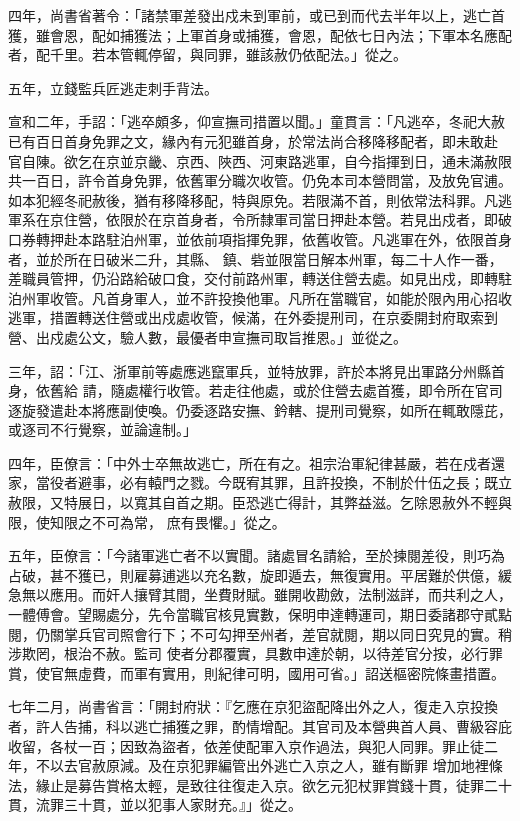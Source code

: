 \begin{pinyinscope}
 四年，尚書省著令：「諸禁軍差發出戍未到軍前，或已到而代去半年以上，逃亡首獲，雖會恩，配如捕獲法；上軍首身或捕獲，會恩，配依七日內法；下軍本名應配者，配千里。若本管輒停留，與同罪，雖該赦仍依配法。」從之。



 五年，立錢監兵匠逃走刺手背法。



 宣和二年，手詔：「逃卒頗多，仰宣撫司措置以聞。」童貫言：「凡逃卒，冬祀大赦已有百日首身免罪之文，緣內有元犯雖首身，於常法尚合移降移配者，即未敢赴
 官自陳。欲乞在京並京畿、京西、陜西、河東路逃軍，自今指揮到日，通未滿赦限共一百日，許令首身免罪，依舊軍分職次收管。仍免本司本營問當，及放免官逋。如本犯經冬祀赦後，猶有移降移配，特與原免。若限滿不首，則依常法科罪。凡逃軍系在京住營，依限於在京首身者，令所隸軍司當日押赴本營。若見出戍者，即破口券轉押赴本路駐泊州軍，並依前項指揮免罪，依舊收管。凡逃軍在外，依限首身者，並於所在日破米二升，其縣、
 鎮、砦並限當日解本州軍，每二十人作一番，差職員管押，仍沿路給破口食，交付前路州軍，轉送住營去處。如見出戍，即轉駐泊州軍收管。凡首身軍人，並不許投換他軍。凡所在當職官，如能於限內用心招收逃軍，措置轉送住營或出戍處收管，候滿，在外委提刑司，在京委開封府取索到營、出戍處公文，驗人數，最優者申宣撫司取旨推恩。」並從之。



 三年，詔：「江、浙軍前等處應逃竄軍兵，並特放罪，許於本將見出軍路分州縣首身，依舊給
 請，隨處權行收管。若走往他處，或於住營去處首獲，即令所在官司逐旋發遣赴本將應副使喚。仍委逐路安撫、鈐轄、提刑司覺察，如所在輒敢隱芘，或逐司不行覺察，並論違制。」



 四年，臣僚言：「中外士卒無故逃亡，所在有之。祖宗治軍紀律甚嚴，若在戍者還家，當役者避事，必有轅門之戮。今既宥其罪，且許投換，不制於什伍之長；既立赦限，又特展日，以寬其自首之期。臣恐逃亡得計，其弊益滋。乞除恩赦外不輕與限，使知限之不可為常，
 庶有畏懼。」從之。



 五年，臣僚言：「今諸軍逃亡者不以實聞。諸處冒名請給，至於揀閱差役，則巧為占破，甚不獲已，則雇募逋逃以充名數，旋即遁去，無復實用。平居難於供億，緩急無以應用。而奸人攘臂其間，坐費財賦。雖開收勘斂，法制滋詳，而共利之人，一體傅會。望賜處分，先令當職官核見實數，保明申達轉運司，期日委諸郡守貳點閱，仍關掌兵官司照會行下；不可勾押至州者，差官就閱，期以同日究見的實。稍涉欺罔，根治不赦。監司
 使者分郡覆實，具數申達於朝，以待差官分按，必行罪賞，使官無虛費，而軍有實用，則紀律可明，國用可省。」詔送樞密院條畫措置。



 七年二月，尚書省言：「開封府狀：『乞應在京犯盜配降出外之人，復走入京投換者，許人告捕，科以逃亡捕獲之罪，酌情增配。其官司及本營典首人員、曹級容庇收留，各杖一百；因致為盜者，依差使配軍入京作過法，與犯人同罪。罪止徒二年，不以去官赦原減。及在京犯罪編管出外逃亡入京之人，雖有斷罪
 增加地裡條法，緣止是募告賞格太輕，是致往往復走入京。欲乞元犯杖罪賞錢十貫，徒罪二十貫，流罪三十貫，並以犯事人家財充。』」從之。




\end{pinyinscope}
